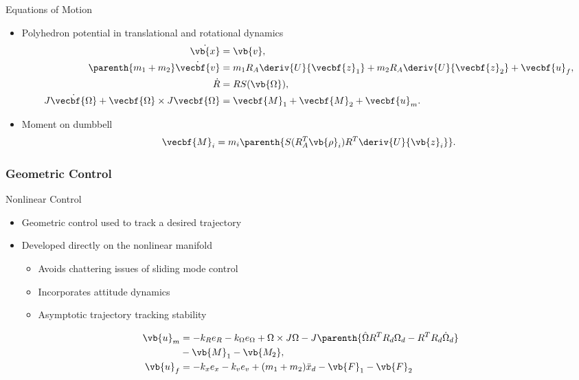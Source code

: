 \begin{frame}{Equations of Motion}

    \begin{itemize}
        \item Polyhedron potential in translational and rotational dynamics
        \begin{align*}
            \dot{\vb{x}} &= \vb{v}, \\
            \parenth{m_1 + m_2} \dot{\vecbf{v}} &= m_1 R_A \deriv{U}{\vecbf{z}_1} + m_2 R_A \deriv{U}{\vecbf{z}_2} + \vecbf{u}_f, \\
            \dot{R} &= R S(\vb{\Omega}) , \\
            J \dot{\vecbf{\Omega}} + \vecbf{\Omega} \times J \vecbf{\Omega} &= \vecbf{M}_1 + \vecbf{M}_2 + \vecbf{u}_m. 
        \end{align*}
    \item Moment on dumbbell
        \begin{align*}
            \vecbf{M}_i = m_i \parenth{S(R_A^T \vb{\rho}_i) R^T \deriv{U}{\vb{z}_i}}.
        \end{align*}
    \end{itemize}
\end{frame}

\subsubsection[Geometric Control]{Geometric Control}

\begin{frame}{Nonlinear Control}
    \begin{itemize}
        \item Geometric control used to track a desired trajectory
        \item Developed directly on the nonlinear manifold
            \begin{itemize}
                \item Avoids chattering issues of sliding mode control
                \item Incorporates attitude dynamics
                \item Asymptotic trajectory tracking stability
            \end{itemize}
    \end{itemize}

\pause
\begin{align*}
    \vb{u}_m &= - k_R e_R - k_\Omega e_\Omega + \Omega \times J \Omega - J \parenth{\hat{\Omega} R^T R_d \Omega_d - R^T R_d \dot{\Omega}_d}  \\
             &- \vb{M}_1 - \vb{M_2} , \\
    \vb{u}_f &= - k_x e_x  - k_v e_v + ( m_1  + m_2 ) \ddot{x}_d - \vb{F}_1 - \vb{F}_2 
\end{align*}
\end{frame}


